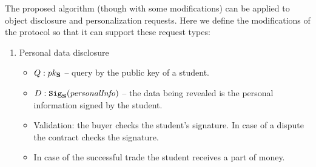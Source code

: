The proposed algorithm (though with some modifications) can be applied to object disclosure and personalization requests. Here we define the modifications of the protocol so that it can support these request types:
\begin{enumerate}

\item Personal data disclosure
\begin{itemize}
\item $Q: pk_{\mathbf{S}}$ -- query by the public key of a student.
\item $D: \mathtt{Sig}_{\mathbf{S}}(\mathit{personalInfo})$ -- the data being revealed is the personal information signed by the student.
\item Validation: the buyer checks the student's signature. In case of a dispute the contract checks the signature.
\item In case of the successful trade the student receives a part of money.
\end{itemize}
\end{enumerate}
